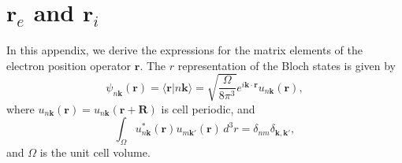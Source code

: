 \documentclass[aps,letterpaper]{revtex4}
\begin{document}
\section{\texorpdfstring{$\mathbf{r}_{e}$ and $\mathbf{r}_{i}$}{re and ri}}
\label{app:re_ri}

In this appendix, we derive the expressions for the matrix elements of the
electron position operator $\mathbf{r}$. The $r$ representation of the Bloch
states is given by
\begin{equation}\label{bloch}
\psi_{n\mathbf{k}}(\mathbf{r})=\langle\mathbf{r}\vert n\mathbf{k}\rangle =
\sqrt{\frac{\Omega}{8\pi^{3}}}
e^{i\mathbf{k} \cdot \mathbf{r}}u_{n\mathbf{k}}(\mathbf{r}),
\end{equation}
where $u_{n\mathbf{k}}(\mathbf{r}) = u_{n\mathbf{k}}(\mathbf{r} + \mathbf{R})$
is cell periodic, and
\begin{equation}\label{normal}
\int_{\Omega}
u_{n\mathbf{k}}^{*}(\mathbf{r})u_{m\mathbf{k}'}(\mathbf{r})\,d^{3}r
= \delta_{nm}\delta_{\mathbf{\mathbf{k},\mathbf{k}'}},
\end{equation}
and $\Omega$ is the unit cell volume.
\end{document}
